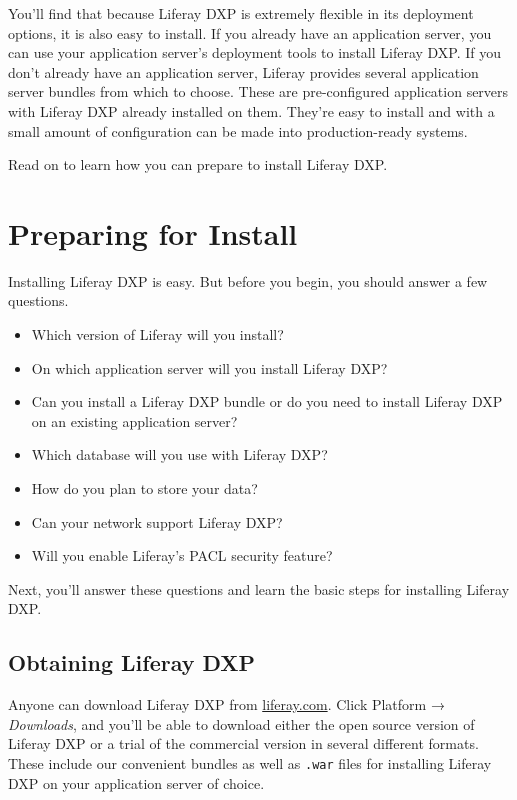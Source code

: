 You'll find that because Liferay DXP is extremely flexible in its
deployment options, it is also easy to install. If you already have an
application server, you can use your application server's deployment
tools to install Liferay DXP. If you don't already have an application
server, Liferay provides several application server bundles from which
to choose. These are pre-configured application servers with Liferay DXP
already installed on them. They're easy to install and with a small
amount of configuration can be made into production-ready systems.

Read on to learn how you can prepare to install Liferay DXP.

\section{Preparing for Install}\label{preparing-for-install}

Installing Liferay DXP is easy. But before you begin, you should answer
a few questions.

\begin{itemize}
\tightlist
\item
  Which version of Liferay will you install?
\item
  On which application server will you install Liferay DXP?
\item
  Can you install a Liferay DXP bundle or do you need to install
  Liferay DXP on an existing application server?
\item
  Which database will you use with Liferay DXP?
\item
  How do you plan to store your data?
\item
  Can your network support Liferay DXP?
\item
  Will you enable Liferay's PACL security feature?
\end{itemize}

Next, you'll answer these questions and learn the basic steps for
installing Liferay DXP.

\subsection{Obtaining Liferay DXP}\label{obtaining-liferay-dxp}

Anyone can download Liferay DXP from
\href{https://www.liferay.com}{liferay.com}. Click Platform →
\emph{Downloads}, and you'll be able to download either the open source
version of Liferay DXP or a trial of the commercial version in several
different formats. These include our convenient bundles as well as
\texttt{.war} files for installing Liferay DXP on your application
server of choice.

